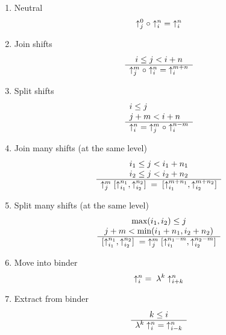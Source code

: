 \begin{enumerate}

    \item Neutral
        $$
        \uparrow^{0}_{j} \circ \uparrow^{n}_{i}
        \;=\;
        \uparrow^{n}_{i}
        $$


    \item Join shifts
        $$
            \begin{array}{c} 
                i \le j < i + n
             \\ \hline 
                \uparrow^{m}_{j} \circ \uparrow^{n}_{i}
                \;=\;
                \uparrow^{m + n}_{i}
             \end{array}
        $$


    \item Split shifts
        $$
            \begin{array}{l} 
                i \le j
                \\
                j + m < i + n
             \\ \hline 
                \uparrow^{n}_{i} \;=\; \uparrow^{m}_{j} \circ \uparrow^{n  - m}_{i}
             \end{array}
        $$


    \item Join many shifts (at the same level)
        $$
        \begin{array}{c} 
            i_1 \le j < i_1 + n_1
            \\
            i_2 \le j < i_2 + n_2
         \\ \hline 
            \uparrow^{m}_{j} [\uparrow^{n_1}_{i_1}, \uparrow^{n_2}_{i_2}]
            \;=\;
            [\uparrow^{m + n_1}_{i_1}, \uparrow^{m + n_2}_{i_2}]
         \end{array}
        $$


    \item Split many shifts (at the same level)
        $$
        \begin{array}{c} 
            \text{max}(i_1, i_2) \le j
            \\
            j + m < \text{min}(i_1 + n_1, i_2 + n_2)
         \\ \hline 
            [\uparrow^{n_1}_{i_1}, \uparrow^{n_2}_{i_2}]
            \;=\;
            \uparrow^{m}_{j} [
                \uparrow^{n_1 - m}_{i_1},
                \uparrow^{n_2 - m}_{i_2}
            ]
         \end{array}
        $$


    \item Move into binder
        $$
        \uparrow^{n}_{i}  \;=\; \lambda^k \uparrow^{n}_{i + k}
        $$


    \item Extract from binder
        $$
        \begin{array}{c} 
            k \le i
         \\ \hline 
            \lambda^k \uparrow^{n}_{i} \;=\; \uparrow^{n}_{i - k}
         \end{array}
        $$
\end{enumerate}
